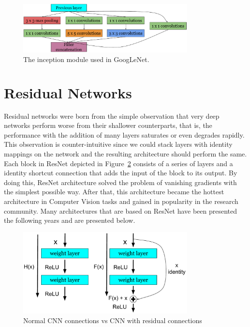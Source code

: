 \begin{figure}[]
    \begin{center}
    \includegraphics[width=0.8\textwidth]{images/GoogLeNet.pdf}
    \end{center}
    \caption{The inception module used in GoogLeNet.} \label{fig:GoogLeNet}
\end{figure}


\section{Residual Networks}
Residual networks were born from the simple observation that very deep networks perform worse from their shallower counterparts, that is, the performance with the addition of many layers saturates or even degrades rapidly. This observation is counter-intuitive since we could stack layers with identity mappings on the network and the resulting architecture should perform the same. Each block in ResNet depicted in Figure~\ref{fig:ResNet_1} consists of a series of layers and a identity shortcut connection that adds the input of the block to its output. By doing this, ResNet architecture solved the problem of vanishing gradients with the simplest possible way. After that, this architecture became the hottest architecture in Computer Vision tasks and gained in popularity in the research community. Many architectures that are based on ResNet have been presented the following years and are presented below.

\begin{figure}[]
    \begin{center}
    \includegraphics[width=0.8\textwidth]{images/ResNet_1.pdf}
    \end{center}
    \caption{Normal CNN connections vs CNN with residual connections} \label{fig:ResNet_1}
\end{figure}

